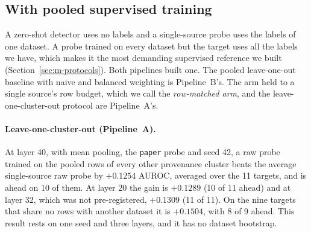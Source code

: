 \subsection{With pooled supervised training}
\label{sec:r-pooled}

A zero-shot detector uses no labels and a single-source probe uses the labels of one dataset.
A probe trained on every dataset but the target uses all the labels we have, which makes it the most demanding supervised reference we built (Section~\ref{sec:m-protocols}).
Both pipelines built one.
The pooled leave-one-out baseline with naive and balanced weighting is Pipeline~B's. %
The arm held to a single source's row budget, which we call the \emph{row-matched arm}, and the leave-one-cluster-out protocol are Pipeline~A's. %

\paragraph{Leave-one-cluster-out (Pipeline~A).} At layer 40, with mean pooling, the \texttt{paper} probe and seed 42, a raw probe trained on the pooled rows of every other provenance cluster beats the average single-source raw probe by $+0.1254$ AUROC, averaged over the 11 targets, and is ahead on 10 of them. %
At layer 20 the gain is $+0.1289$ (10 of 11 ahead) and at layer 32, which was not pre-registered, $+0.1309$ (11 of 11). %
On the nine targets that share no rows with another dataset it is $+0.1504$, with 8 of 9 ahead. %
This result rests on one seed and three layers, and it has no dataset bootstrap. %

